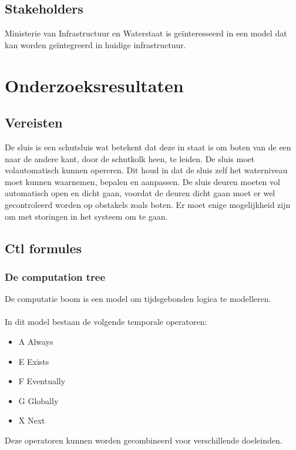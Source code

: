 \documentclass{article}
\begin{document}
\subsection{Stakeholders}
Ministerie van Infrastructuur en Waterstaat is geïnteresseerd in een model dat kan worden geïntegreerd in huidige infrastructuur.



\section{Onderzoeksresultaten}

\subsection{Vereisten}

De sluis is een schutsluis wat betekent dat deze in staat is om boten van de een naar de andere kant, door de schutkolk heen, te leiden. De sluis moet volautomatisch kunnen opereren. Dit houd in dat de sluis zelf het waterniveau moet kunnen waarnemen, bepalen en aanpassen. De sluis deuren moeten vol automatisch open en dicht gaan, voordat de deuren dicht gaan moet er wel gecontroleerd worden op obstakels zoals boten. Er moet enige mogelijkheid zijn om met storingen in het systeem om te gaan.

\subsection{Ctl formules} \label{sec:ctl-formules}

\subsubsection{De computation tree}

De computatie boom is een model om tijdsgebonden logica te modelleren. \\\\
In dit model bestaan de volgende temporale operatoren:
\begin{itemize}
    \item A Always
    \item E Exists
    \item F Eventually
    \item G Globally
    \item X Next
\end{itemize}
Deze operatoren kunnen worden gecombineerd voor verschillende doeleinden.
\end{document}
